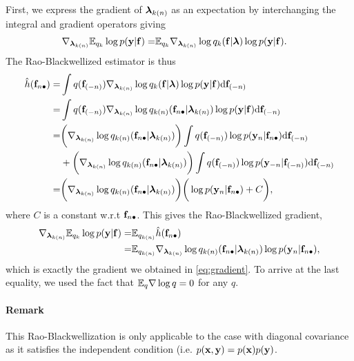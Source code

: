 \documentclass{article} %
\begin{document}
First, we express the gradient of $\lamkn$ as an expectation by interchanging the integral and gradient operators giving
\begin{align}
\nabla_{\lamkn} \expectation_{q_k} \log p(\y | \f ) 
=& \expectation_{q_k} \nabla_{\lamkn} \log q_k(\f | \llambda) \log p(\y | \f).
\end{align}
The Rao-Blackwellized estimator is thus
\begin{align}
\hat h(\fn) 
=& \int q(\fnn) \nabla_{\lamkn} \log q_k(\f | \llambda) \log p(\y | \f) \der \fnn \\
=& \int q(\fnn) \gradkn \log p(\y | \f) \der \fnn \\
=& \bigg(\gradkn \bigg) \int q(\fnn) \log p(\y_n | \fn) \der \fnn \\
&+ \bigg( \gradkn \bigg) \int q(\fnn) \log p(\y_{-n} | \fnn)  \der \fnn \\
=& \bigg(\gradkn \bigg) \bigg(\log p(\y_n | \fn) + C \bigg),
\end{align}
where $C$ is a constant w.r.t $\fn$.
This gives the Rao-Blackwellized gradient,
\begin{align}
\nabla_{\lamkn} \expectation_{q_k} \log p(\y | \f ) 
=& \expectation_{q_{k(n)}} \hat h(\fn) \\
=& \expectation_{q_{k(n)}} \gradkn \log p(\y_n | \fn),
\end{align}
which is exactly the gradient we obtained in \eqref{eq:gradient}. 
To arrive at the last equality, we used the fact that $\expectation_q \nabla \log q = 0$ for any $q$.

\paragraph{Remark}
This Rao-Blackwellization is only applicable to the case with diagonal covariance as it satisfies the independent condition (i.e. $p(\x,\y) = p(\x) p(\y)$.

\end{document}
